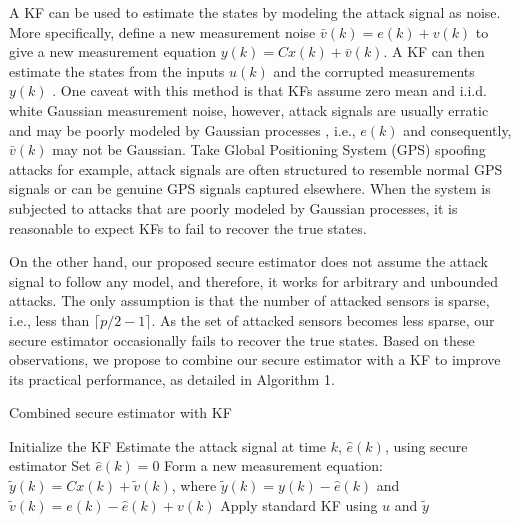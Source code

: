 \documentclass[12pt, conference, a4paper, twoside]{IEEEconf_mod}
\begin{document}
A KF can be used to estimate the states by modeling the attack signal as noise. More specifically, define a new measurement noise $\bar{v}(k) = e(k) + v(k)$ to give a new measurement equation $y(k) = C x(k) + \bar{v}(k)$. A KF can then estimate the states from the inputs $u(k)$ and the corrupted measurements $y(k)$ \cite{KwonACC}. 
One caveat with this method is that KFs assume zero mean and i.i.d. white Gaussian measurement noise, however, attack signals are usually erratic and may be poorly modeled by Gaussian processes \cite{KwonACC}, i.e., $e(k)$ and consequently, $\bar v(k)$ may not be Gaussian. Take Global Positioning System (GPS) spoofing attacks for example, attack signals are often structured to resemble normal GPS signals or can be genuine GPS signals captured elsewhere. %
When the system is subjected to attacks that are poorly modeled by Gaussian processes, it is reasonable to expect KFs to fail to recover the true states. 

On the other hand, our proposed secure estimator does not assume the attack signal to follow any model, and therefore, it works for arbitrary and unbounded attacks. The only assumption is that the number of attacked sensors is sparse, i.e., less than $\lceil p/2-1\rceil$. 
As the set of attacked sensors becomes less sparse, our secure estimator occasionally fails to recover the true states. 
Based on these observations, we propose to combine our secure estimator with a KF to improve its practical performance, as detailed in Algorithm 1.
\begin{algorithm}
\caption{Combined secure estimator with KF}
\label{al:se_kf}
\begin{algorithmic}[1]
\State Initialize the KF
		\State Estimate the attack signal at time $k$, $\hat e(k)$, using secure estimator
	\Else
		\State Set $\hat e(k) = 0$
	\EndIf
	\State Form a new measurement equation: $\tilde y(k) =  C x(k) + \tilde v(k)$, where $\tilde y(k) = y(k) - \hat e(k)$ and $ \tilde v(k) = e (k) - \hat e(k) + v(k)$
	\State Apply standard KF using $u$ and $\tilde y$ 
\EndFor
\end{algorithmic}
\end{algorithm}
\end{document}
